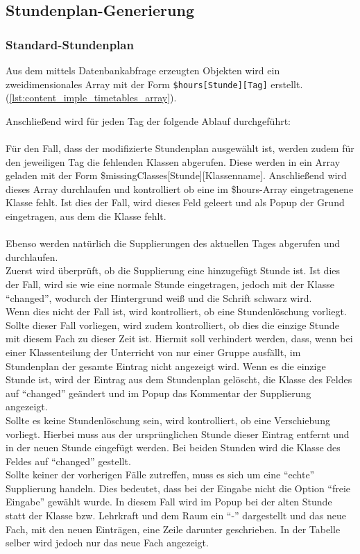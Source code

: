 \subsection{Stundenplan-Generierung}
\subsubsection{Standard-Stundenplan}
Aus dem mittels Datenbankabfrage erzeugten Objekten wird ein zweidimensionales Array mit der Form \texttt{\$hours[Stunde][Tag]} erstellt. (\autoref{lst:content_imple_timetables_array}).


Anschließend wird für jeden Tag der folgende Ablauf durchgeführt:\\\\
Für den Fall, dass der modifizierte Stundenplan ausgewählt ist, werden zudem für den jeweiligen Tag die fehlenden Klassen abgerufen. Diese werden in ein Array geladen mit der Form \$missingClasses[Stunde][Klassenname]. Anschließend wird dieses Array durchlaufen und kontrolliert ob eine im \$hours-Array eingetragenene Klasse fehlt. Ist dies der Fall, wird dieses Feld geleert und als Popup der Grund eingetragen, aus dem die Klasse fehlt. \\\\
Ebenso werden natürlich die Supplierungen des aktuellen Tages abgerufen und durchlaufen. \\
Zuerst wird überprüft, ob die Supplierung eine hinzugefügt Stunde ist. Ist dies der Fall, wird sie wie eine normale Stunde eingetragen, jedoch mit der Klasse \enquote{changed}, wodurch der Hintergrund weiß und die Schrift schwarz wird.\\
Wenn dies nicht der Fall ist, wird kontrolliert, ob eine Stundenlöschung vorliegt. Sollte dieser Fall vorliegen, wird zudem kontrolliert, ob dies die einzige Stunde mit diesem Fach zu dieser Zeit ist. Hiermit soll verhindert werden, dass, wenn bei einer Klassenteilung der Unterricht von nur einer Gruppe ausfällt, im Stundenplan der gesamte Eintrag nicht angezeigt wird. Wenn es die einzige Stunde ist, wird der Eintrag aus dem Stundenplan gelöscht, die Klasse des Feldes auf \enquote{changed} geändert und im Popup das Kommentar der Supplierung angezeigt.\\
Sollte es keine Stundenlöschung sein, wird kontrolliert, ob eine Verschiebung vorliegt. Hierbei muss aus der ursprünglichen Stunde dieser Eintrag entfernt und in der neuen Stunde eingefügt werden. Bei beiden Stunden wird die Klasse des Feldes auf \enquote{changed} gestellt.\\
Sollte keiner der vorherigen Fälle zutreffen, muss es sich um eine \enquote{echte} Supplierung handeln. Dies bedeutet, dass bei der Eingabe nicht die Option \enquote{freie Eingabe} gewählt wurde. In diesem Fall wird im Popup bei der alten Stunde statt der Klasse bzw. Lehrkraft und dem Raum ein \enquote{-} dargestellt und das neue Fach, mit den neuen Einträgen, eine Zeile darunter geschrieben. In der Tabelle selber wird jedoch nur das neue Fach angezeigt.

